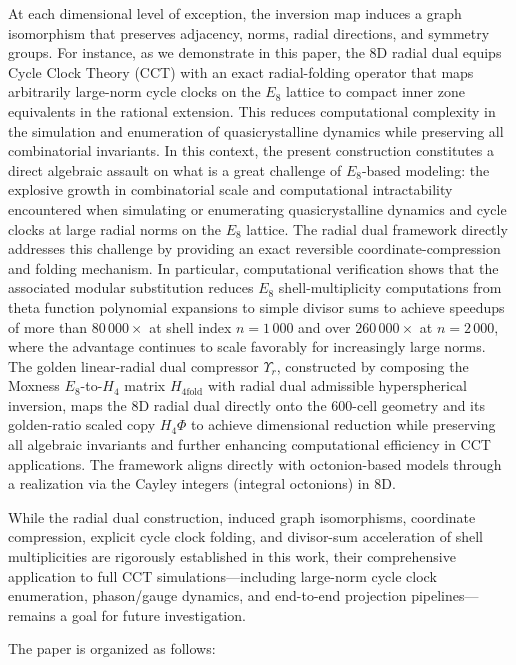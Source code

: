 \documentclass{article}
\begin{document}
At each dimensional level of exception, the inversion map induces a graph isomorphism that preserves adjacency, norms, radial directions, and symmetry groups. For instance, as we demonstrate in this paper, the 8D radial dual equips Cycle Clock Theory (CCT) with an exact radial-folding operator that maps arbitrarily large-norm cycle clocks on the $E_8$ lattice to compact inner zone equivalents in the rational extension. This reduces computational complexity in the simulation and enumeration of quasicrystalline dynamics while preserving all combinatorial invariants. In this context, the present construction constitutes a direct algebraic assault on what is a great challenge of $E_8$-based modeling: the explosive growth in combinatorial scale and computational intractability encountered when simulating or enumerating quasicrystalline dynamics and cycle clocks at large radial norms on the $E_8$ lattice. The radial dual framework directly addresses this challenge by providing an exact reversible coordinate-compression and folding mechanism. In particular, computational verification shows that the associated modular substitution reduces $E_8$ shell-multiplicity computations from theta function polynomial expansions to simple divisor sums to achieve speedups of more than $80\,000\times$ at shell index $n=1\,000$ and over $260\,000\times$ at $n=2\,000$, where the advantage continues to scale favorably for increasingly large norms. The golden linear-radial dual compressor \(\Upsilon_r\), constructed by composing the Moxness $E_8$-to-$H_4$ matrix \(H_{4\mathrm{fold}}\) \cite{Moxness2014} with radial dual admissible hyperspherical inversion, maps the 8D radial dual directly onto the 600-cell geometry and its golden-ratio scaled copy \(H_4\Phi\) to achieve dimensional reduction while preserving all algebraic invariants and further enhancing computational efficiency in CCT applications. The framework aligns directly with octonion-based models through a realization via the Cayley integers (integral octonions) in 8D.

While the radial dual construction, induced graph isomorphisms, coordinate compression, explicit cycle clock folding, and divisor-sum acceleration of shell multiplicities are rigorously established in this work, their comprehensive application to full CCT simulations—including large-norm cycle clock enumeration, phason/gauge dynamics, and end-to-end projection pipelines—remains a goal for future investigation.

The paper is organized as follows:
\end{document}
